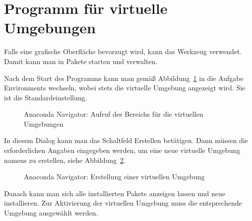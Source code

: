 \section{Programm  für virtuelle Umgebungen}

Falls eine grafische Oberfläche bevorzugt wird, kann das Werkzeug  verwendet. Damit kann man in  Pakete starten und verwalten.

Nach dem Start des Programms kann man gemäß Abbildung~\ref{env:Navigator} in die Aufgabe \glqq Environments\grqq {} wechseln, wobei stets die virtuelle Umgebung  angezeigt wird. Sie ist die Standardeinstellung.  

\begin{figure}
	
	\caption{Anaconda Navigator: Aufruf des Bereichs für die virtuellen Umgebungen}
	
	\label{env:Navigator}  
\end{figure}

In diesem Dialog kann man das Schaltfeld \glqq Erstellen\grqq{} betätigen. Dann müssen die erforderlichen Angaben eingegeben werden,  um eine neue virtuelle Umgebung namens  zu erstellen, siehe Abbildung~\ref{env:new}. 

\begin{figure}
	
	\caption{Anaconda Navigator: Erstellung einer virtuellen Umgebung}
	
	\label{env:new}  
\end{figure}


Danach kann man sich alle installierten Pakete anzeigen lassen und neue installieren.
Zur Aktivierung der virtuellen Umgebung muss die entsprechende Umgebung ausgewählt werden.

%
%	
%	
%
     
    
